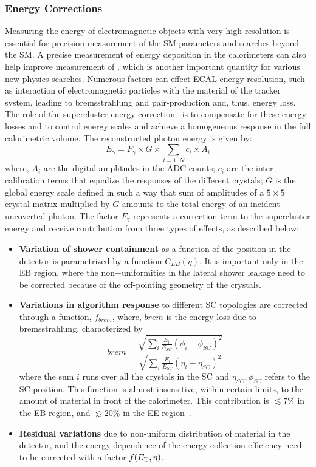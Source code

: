 \subsubsection{Energy Corrections}
Measuring the energy of electromagnetic objects with very high resolution is essential for precision measurement of the SM parameters and searches 
beyond the SM. A precise measurement of energy deposition in the calorimeters can also help improve measurement of \met, which is another important 
quantity for various new physics searches. Numerous factors can effect ECAL energy resolution, such as interaction of electromagnetic particles with 
the material of the tracker system, leading to bremsstrahlung and pair-production and, thus, energy loss. The role of the supercluster energy 
correction~\cite{Anderson:1365024} is to compensate for these energy losses and to control energy scales and achieve a homogeneous response 
in the full calorimetric volume. The reconstructed photon energy is given by:
\begin{equation}
E_{\gamma} = F_{\gamma}\times{G}\times\sum_{i=1..N}c_{i}\times{A_{i}}
\end{equation}
where, $A_{i}$ are the digital amplitudes in the ADC counts; $c_{i}$ are the inter-calibration terms that equalize the responses of the different
crystals; $G$ is the global energy scale defined in such a way that sum of amplitudes of a $5\times5$ crystal matrix multiplied by $G$ amounts
to the total energy of an incident uncoverted photon. The factor $F_{\gamma}$ represents a correction term to the supercluster energy and receive
contribution from three types of effects, as described below:
\begin{itemize}
\item {\bf Variation of shower containment} as a function of the position in the detector is parametrized by a function $C_{EB}(\eta)$. It is 
important only in the EB region, where the non$-$uniformities in the lateral shower leakage need to be corrected because of the off-pointing geometry
of the crystals. %
\item {\bf Variations in algorithm response} to different SC topologies are corrected through a function, $f_{brem}$, where, $brem$ is the 
energy loss due to bremsstrahlung, characterized by
\begin{equation}
brem = \frac{\sqrt{\sum_{i} \frac{E_{i}}{E_{SC}}(\phi_{i}-\phi_{SC})^{2}}}{\sqrt{\sum_{i}\frac{E_{i}}{E_{SC}}(\eta_{i}-\eta_{SC})^{2}}}
\end{equation}
where the sum $i$ runs over all the crystals in the SC and $\eta_{SC}, \phi_{SC}$ refers to the SC position. This function is almost 
insensitive, within certain limits, to the amount of material in front of the calorimeter. This contribution is $\lesssim7\%$ in the EB region,
and $\lesssim20\%$ in the EE region~\cite{Anderson:1365024}.
\item {\bf Residual variations} due to non-uniform distribution of material in the detector, and the energy dependence of the energy-collection
efficiency need to be corrected with a factor $f(E_{\mathrm T},\eta)$.
\end{itemize}

